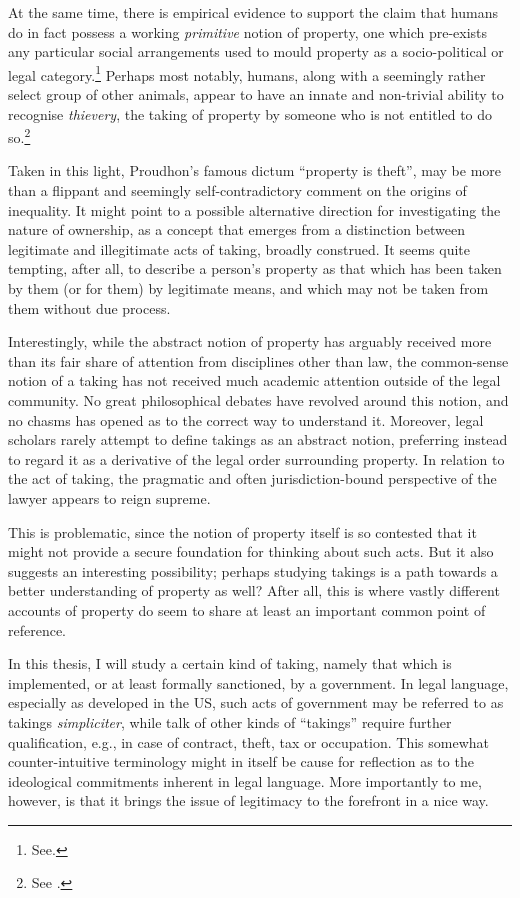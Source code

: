 \documentclass{book} %
\begin{document}
At the same time, there is empirical evidence to support the claim that humans do in fact possess a working {\it primitive} notion of property, one which pre-exists any particular social arrangements used to mould property as a socio-political or legal category.\footnote{See\cite{stake06}.} Perhaps most notably, humans, along with a seemingly rather select group of other animals, appear to have an innate and non-trivial ability to recognise {\it thievery}, the taking of property by someone who is not entitled to do so.\footnote{See \cite[11-13]{brosnan11}.}

Taken in this light, Proudhon's famous dictum ``property is theft'', may be more than a flippant and seemingly self-contradictory comment on the origins of inequality. It might point to a possible alternative direction for investigating the nature of ownership, as a concept that emerges from a distinction between legitimate and illegitimate acts of taking, broadly construed. It seems quite tempting, after all, to describe a person's property as that which has been taken by them (or for them) by legitimate means, and which may not be taken from them without due process.

Interestingly, while the abstract notion of property has arguably received more than its fair share of attention from disciplines other than law, the common-sense notion of a taking has not received much academic attention outside of the legal community. No great philosophical debates have revolved around this notion, and no chasms has opened as to the correct way to understand it. Moreover, legal scholars rarely attempt to define takings as an abstract notion, preferring instead to regard it as a derivative of the legal order surrounding property. In relation to the act of taking, the pragmatic and often jurisdiction-bound perspective of the lawyer appears to reign supreme.

This is problematic, since the notion of property itself is so contested that it might not provide a secure foundation for thinking about such acts. But it also suggests an interesting possibility; perhaps studying takings is a path towards a better understanding of property as well? After all, this is where vastly different accounts of property do seem to share at least an important common point of reference.

In this thesis, I will study a certain kind of taking, namely that which is implemented, or at least formally sanctioned, by a government. In legal language, especially as developed in the US, such acts of government may be referred to as takings {\it simpliciter}, while talk of other kinds of ``takings'' require further qualification, e.g., in case of contract, theft, tax or occupation. This somewhat counter-intuitive terminology might in itself be cause for reflection as to the ideological commitments inherent in legal language. More importantly to me, however, is that it brings the issue of legitimacy to the forefront in a nice way.
\end{document}
